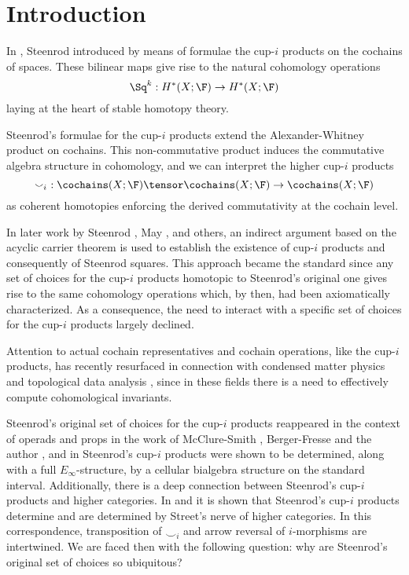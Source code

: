 
\section{Introduction} \label{s:introduction}

In \cite{steenrod1947products}, Steenrod introduced by means of formulae the cup-$i$ products on the cochains of spaces. These bilinear maps give rise to the natural cohomology operations
\begin{equation*}
\Sq^k : H^*(X; \F) \to H^{*}(X; \F)
\end{equation*}
laying at the heart of stable homotopy theory.

Steenrod's formulae for the cup-$i$ products extend the Alexander-Whitney product on cochains. This non-commutative product induces the commutative algebra structure in cohomology, and we can interpret the higher cup-$i$ products
\begin{equation*}
\smallsmile_i\ : \cochains(X; \F) \tensor \cochains(X; \F) \to \cochains(X; \F)
\end{equation*}
as coherent homotopies enforcing the derived commutativity at the cochain level.

In later work by Steenrod \cite{steenrod1962cohomology}, May \cite{may1970general}, and others, an indirect argument based on the acyclic carrier theorem is used to establish the existence of cup-$i$ products and consequently of Steenrod squares. This approach became the standard since any set of choices for the cup-$i$ products homotopic to Steenrod's original one gives rise to the same cohomology operations which, by then, had been axiomatically characterized. As a consequence, the need to interact with a specific set of choices for the cup-$i$ products largely declined.

Attention to actual cochain representatives and cochain operations, like the \mbox{cup-$i$} products, has recently resurfaced in connection with condensed matter physics \cite{} and topological data analysis \cite{carlsson2009topology,tauzin2020giottotda}, since in these fields there is a need to effectively compute cohomological invariants.

Steenrod's original set of choices for the cup-$i$ products reappeared in the context of operads and props in the work of McClure-Smith \cite{mcclure2003multivariable}, Berger-Fresse \cite{berger2004combinatorial} and the author \cite{medina2018algebraic}, and in \cite{medina2018cellular} Steenrod's cup-$i$ products were shown to be determined, along with a full $E_\infty$-structure, by a cellular bialgebra structure on the standard interval. Additionally, there is a deep connection between Steenrod's cup-$i$ products and higher categories. In \cite{medina2019globular} and \cite{bibid} it is shown that Steenrod's cup-$i$ products determine and are determined by Street's nerve of higher categories. In this correspondence, transposition of $\smallsmile_i$ and arrow reversal of $i$-morphisms are intertwined. We are faced then with the following question: why are Steenrod's original set of choices so ubiquitous?

